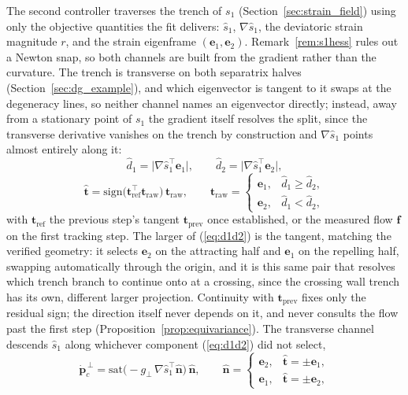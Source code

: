 \documentclass[lettersize,journal]{IEEEtran}
\begin{document}
The second controller traverses the trench of $s_1$
(Section~\ref{sec:strain_field}) using only the objective quantities the
fit delivers: $\hat{s}_1$, $\nabla\hat{s}_1$, the deviatoric strain
magnitude $r$, and the strain eigenframe $(\mathbf{e}_1, \mathbf{e}_2)$.
Remark~\ref{rem:s1hess} rules out a Newton snap, so both channels are
built from the gradient rather than the curvature. The trench is
transverse on both separatrix halves (Section~\ref{sec:dg_example}), and
which eigenvector is tangent to it swaps at the degeneracy lines, so
neither channel names an eigenvector directly; instead, away from a
stationary point of $s_1$ the gradient itself resolves the split, since
the transverse derivative vanishes on the trench by construction and
$\nabla\hat{s}_1$ points almost entirely along it:
\begin{equation}
    \hat{d}_1 = \bigl\lvert \nabla\hat{s}_1^\top \mathbf{e}_1
    \bigr\rvert, \qquad
    \hat{d}_2 = \bigl\lvert \nabla\hat{s}_1^\top \mathbf{e}_2
    \bigr\rvert,
    \label{eq:d1d2}
\end{equation}
\begin{equation}
    \hat{\mathbf{t}} = \mathrm{sign}\bigl(\mathbf{t}_{\text{ref}}^\top
    \mathbf{t}_{\text{raw}}\bigr)\,\mathbf{t}_{\text{raw}}, \qquad
    \mathbf{t}_{\text{raw}} = \begin{cases}
        \mathbf{e}_1, & \hat{d}_1 \geq \hat{d}_2, \\
        \mathbf{e}_2, & \hat{d}_1 < \hat{d}_2,
    \end{cases}
    \label{eq:tangent_select}
\end{equation}
with $\mathbf{t}_{\text{ref}}$ the previous step's tangent
$\mathbf{t}_{\text{prev}}$ once established, or the measured flow
$\mathbf{f}$ on the first tracking step. The larger of
(\ref{eq:d1d2}) is the tangent, matching the verified geometry: it
selects $\mathbf{e}_2$ on the attracting half and $\mathbf{e}_1$ on the
repelling half, swapping automatically through the origin, and it is
this same pair that resolves which trench branch to continue onto at a
crossing, since the crossing wall trench has its own, different larger
projection. Continuity with $\mathbf{t}_{\text{prev}}$ fixes only the
residual sign; the direction itself never depends on it, and never
consults the flow past the first step
(Proposition~\ref{prop:equivariance}). The transverse channel descends
$\hat{s}_1$ along whichever component (\ref{eq:d1d2}) did not select,
\begin{equation}
    \dot{\mathbf{p}}_c^{\,\perp} =
    \mathrm{sat}\!\bigl(-g_\perp\,\nabla\hat{s}_1^\top
    \hat{\mathbf{n}}\bigr)\,\hat{\mathbf{n}}, \qquad
    \hat{\mathbf{n}} = \begin{cases}
        \mathbf{e}_2, & \hat{\mathbf{t}} = \pm\mathbf{e}_1, \\
        \mathbf{e}_1, & \hat{\mathbf{t}} = \pm\mathbf{e}_2,
    \end{cases}
    \label{eq:oecs_perp}
\end{equation}
\end{document}
